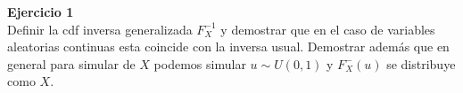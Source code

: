 \documentclass[a4paper, 11pt]{article}
\newenvironment{problem}[2][Ejercicio]
{ \begin{mdframed}[backgroundcolor= red!50] \textbf{#1 #2} \\}
	{  \end{mdframed}}
\begin{document}
	\setlength{\parskip}{\medskipamount}
	\setlength{\parindent}{0pt}

\begin{problem}{1}
    Definir la cdf inversa generalizada $F_X^{-1}$ y demostrar que en el caso de variables aleatorias continuas esta coincide con la inversa usual. Demostrar además que en general para simular de $X$ podemos simular $u\sim U(0,1)$ y $F_X^{-}(u)$ se distribuye como $X$. 
\end{problem}
\end{document}
